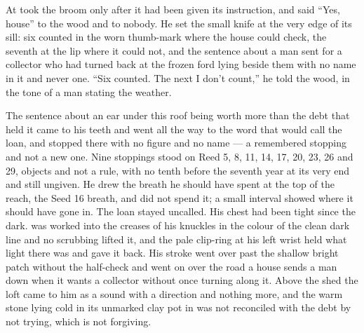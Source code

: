 At   took the broom only after it had been given its instruction, and said “Yes, house” to the wood and to nobody. He set the small knife at the very edge of its sill: six counted in the worn thumb-mark where the house could check, the seventh at the lip where it could not, and the sentence about a man sent for a collector who had turned back at the frozen ford lying beside them with no name in it and never one. “Six counted. The next I don't count,” he told the wood, in the tone of a man stating the weather.

The sentence about an ear under this roof being worth more than the debt that held it came to his teeth and went all the way to the word that would call the loan, and stopped there with no figure and no name --- a remembered stopping and not a new one. Nine stoppings stood on Reed 5, 8, 11, 14, 17, 20, 23, 26 and 29, objects and not a rule, with no tenth before the seventh year at its very end and still ungiven. He drew the breath he should have spent at the top of the reach, the Seed 16 breath, and did not spend it; a small interval showed where it should have gone in. The loan stayed uncalled. His chest had been tight since the dark.  was worked into the creases of his knuckles in the colour of the clean dark line and no scrubbing lifted it, and the pale clip-ring at his left wrist held what light there was and gave it back. His stroke went over  past the shallow bright patch without the half-check and went on over the road a house sends a man down when it wants a collector without once turning along it. Above the shed the loft came to him as a sound with a direction and nothing more, and the warm stone lying cold in its unmarked clay pot in  was not reconciled with the debt by not trying, which is not forgiving.

